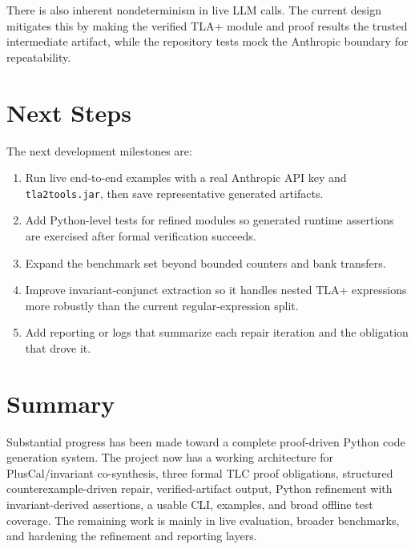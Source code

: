 \documentclass[11pt]{article}
\begin{document}
There is also inherent nondeterminism in live LLM calls. The current design
mitigates this by making the verified TLA+ module and proof results the trusted
intermediate artifact, while the repository tests mock the Anthropic boundary
for repeatability.

\section{Next Steps}

The next development milestones are:

\begin{enumerate}
  \item Run live end-to-end examples with a real Anthropic API key and
  \texttt{tla2tools.jar}, then save representative generated artifacts.
  \item Add Python-level tests for refined modules so generated runtime
  assertions are exercised after formal verification succeeds.
  \item Expand the benchmark set beyond bounded counters and bank transfers.
  \item Improve invariant-conjunct extraction so it handles nested TLA+
  expressions more robustly than the current regular-expression split.
  \item Add reporting or logs that summarize each repair iteration and the
  obligation that drove it.
\end{enumerate}

\section{Summary}

Substantial progress has been made toward a complete proof-driven Python code
generation system. The project now has a working architecture for
PlusCal/invariant co-synthesis, three formal TLC proof obligations, structured
counterexample-driven repair, verified-artifact output, Python refinement with
invariant-derived assertions, a usable CLI, examples, and broad offline test
coverage. The remaining work is mainly in live evaluation, broader benchmarks,
and hardening the refinement and reporting layers.
\end{document}
